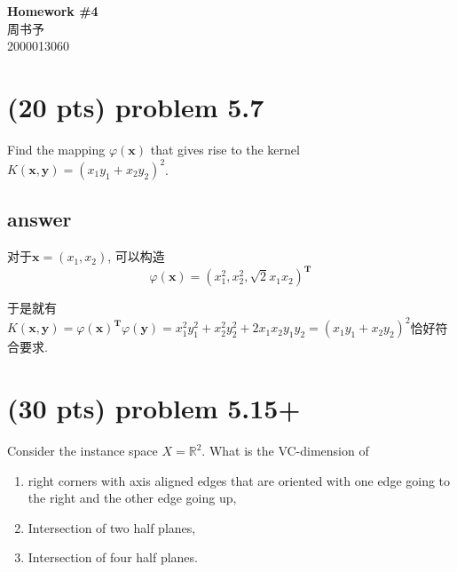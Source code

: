 \documentclass[12pt]{article}
\newcommand{\hwid}{4}			%
\newcommand{\name}{周书予} 		%
\newcommand{\id}{2000013060} 	%
\begin{document}
	
	\pagestyle{fancy}
	\chead{}
	
	\begin{center}
		{\LARGE \bf Homework \#\hwid}\\
		{\Large \name}\\
		{\Large \id}\\
	\end{center}
	
	\section{(20 pts) problem 5.7}
	Find the mapping $\varphi(\mathbf{x})$ that gives rise to the kernel
	$K(\mathbf{x}, \mathbf{y}) = (x_1y_1 + x_2y_2)^2$.
	
	\subsection*{answer}
	对于$\mathbf x = (x_1, x_2)$, 可以构造$$\varphi(\mathbf x) = (x_1^2, x_2^2, \sqrt2
	x_1x_2)^{\mathbf T}$$
	
	于是就有$K(\mathbf x, \mathbf y) = \varphi(\mathbf x)^{\mathbf T}\varphi(\mathbf y)
	= x_1^2y_1^2 + x_2^2y_2^2 + 2x_1x_2y_1y_2 = (x_1y_1 + x_2y_2)^2$恰好符合要求.
	
	\section{(30 pts) problem 5.15+}
	Consider the instance space $X = \mathbb{R}^2$. What is the VC-dimension of
	\begin{enumerate}
		\item right corners with axis aligned edges that are oriented with one edge
		going to the right and the other edge going up,
		\item Intersection of two half planes,
		\item Intersection of four half planes.
	\end{enumerate}
\end{document}
